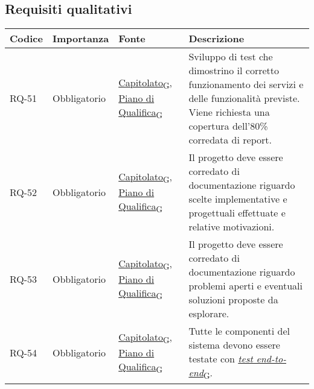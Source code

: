 \subsection{Requisiti qualitativi}
\begin{longtable}{|>{\centering\arraybackslash}m{}|>{\centering\arraybackslash}m{}|>{\centering\arraybackslash}m{}|>{\centering\arraybackslash}m{}|}
	\hline
	\textbf{Codice} & \textbf{Importanza} & \textbf{Fonte}                                                                                                                                                                                                                                       & \textbf{Descrizione}
	\\\hline
	\endfirsthead
	RQ-51           & Obbligatorio        & \href{https://7last.github.io/docs/rtb/documentazione-interna/glossario\#capitolato}{Capitolato\textsubscript{G}}, \href{https://7last.github.io/docs/rtb/documentazione-interna/glossario\#piano-di-qualifica}{Piano di Qualifica\textsubscript{G}} & Sviluppo di test che dimostrino il corretto funzionamento dei servizi e delle funzionalità previste. Viene richiesta una copertura dell'80\% corredata di report.
	\\\hline
	RQ-52           & Obbligatorio        & \href{https://7last.github.io/docs/rtb/documentazione-interna/glossario\#capitolato}{Capitolato\textsubscript{G}}, \href{https://7last.github.io/docs/rtb/documentazione-interna/glossario\#piano-di-qualifica}{Piano di Qualifica\textsubscript{G}} & Il progetto deve essere corredato di documentazione riguardo scelte implementative e progettuali effettuate e relative motivazioni.
	\\\hline
	RQ-53           & Obbligatorio        & \href{https://7last.github.io/docs/rtb/documentazione-interna/glossario\#capitolato}{Capitolato\textsubscript{G}}, \href{https://7last.github.io/docs/rtb/documentazione-interna/glossario\#piano-di-qualifica}{Piano di Qualifica\textsubscript{G}} & Il progetto deve essere corredato di documentazione riguardo problemi aperti e eventuali soluzioni proposte da esplorare.
	\\\hline
	RQ-54           & Obbligatorio        & \href{https://7last.github.io/docs/rtb/documentazione-interna/glossario\#capitolato}{Capitolato\textsubscript{G}}, \href{https://7last.github.io/docs/rtb/documentazione-interna/glossario\#piano-di-qualifica}{Piano di Qualifica\textsubscript{G}} & Tutte le componenti del sistema devono essere testate con \href{https://7last.github.io/docs/rtb/documentazione-interna/glossario\#test-end-to-end}{\textit{test end-to-end}\textsubscript{G}}.

\end{longtable}
